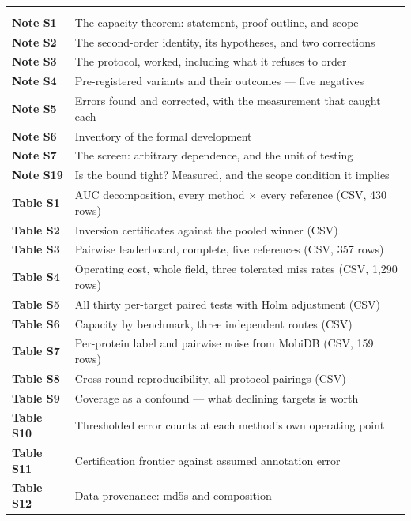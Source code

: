 \begin{center}\footnotesize
\begin{tabular}{ll}
\toprule
\textbf{} & \textbf{} \\
\midrule
\textbf{Note S1} & The capacity theorem: statement, proof outline, and scope \\
\textbf{Note S2} & The second-order identity, its hypotheses, and two corrections \\
\textbf{Note S3} & The protocol, worked, including what it refuses to order \\
\textbf{Note S4} & Pre-registered variants and their outcomes --- five negatives \\
\textbf{Note S5} & Errors found and corrected, with the measurement that caught each \\
\textbf{Note S6} & Inventory of the formal development \\
\textbf{Note S7} & The screen: arbitrary dependence, and the unit of testing \\
\textbf{Note S19} & Is the bound tight? Measured, and the scope condition it implies \\
\textbf{Table S1} & AUC decomposition, every method $\times$ every reference (CSV, 430 rows) \\
\textbf{Table S2} & Inversion certificates against the pooled winner (CSV) \\
\textbf{Table S3} & Pairwise leaderboard, complete, five references (CSV, 357 rows) \\
\textbf{Table S4} & Operating cost, whole field, three tolerated miss rates (CSV, 1,290 rows) \\
\textbf{Table S5} & All thirty per-target paired tests with Holm adjustment (CSV) \\
\textbf{Table S6} & Capacity by benchmark, three independent routes (CSV) \\
\textbf{Table S7} & Per-protein label and pairwise noise from MobiDB (CSV, 159 rows) \\
\textbf{Table S8} & Cross-round reproducibility, all protocol pairings (CSV) \\
\textbf{Table S9} & Coverage as a confound --- what declining targets is worth \\
\textbf{Table S10} & Thresholded error counts at each method's own operating point \\
\textbf{Table S11} & Certification frontier against assumed annotation error \\
\textbf{Table S12} & Data provenance: md5s and composition \\

\end{tabular}
\end{center}
